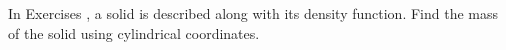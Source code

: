 {\noindent In Exercises} 
{,  a solid is described along with its density function. Find the mass of the solid using  cylindrical coordinates.
}
